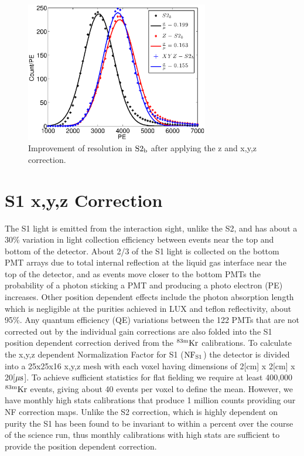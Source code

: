 \begin{figure}[h!]\centering
\includegraphics[width=80mm]{Chapter_XYZ_Corr/Thesis_Corr_Plots/S2_corr_res.eps}
\caption{Improvement of resolution in $\rm S2_b$ after applying the z and x,y,z correction. }
\label{fig:S2_res}
\end{figure}



\section{S1 x,y,z Correction}

The S1 light is emitted from the interaction sight, unlike the S2, and has about a 30\% variation in light collection efficiency between events near the top and bottom of the detector. About 2/3 of the S1 light is collected on the bottom PMT arrays due to total internal reflection at the liquid gas interface near the top of the detector, and as events move closer to the bottom PMTs the probability of a photon sticking a PMT and producing a photo electron (PE) increases. Other position dependent effects include the photon absorption length which is negligible at the purities achieved in LUX and teflon reflectivity, about 95\%. Any quantum efficiency (QE) variations between the 122 PMTs that are not corrected out by the individual gain corrections are also folded into the S1 position dependent correction derived from the $\rm^{83m}Kr$ calibrations.
To calculate the x,y,z dependent Normalization Factor for S1 ($\rm NF_{S1}$) the detector is divided into a 25x25x16 x,y,z mesh with each voxel having dimensions of 2[cm] x 2[cm] x 20[$\rm \mu s$]. To achieve sufficient statistics for flat fielding we require at least 400,000 $\rm^{83m}Kr$ events, giving about 40 events per voxel to define the mean. However, we have monthly high stats calibrations that produce 1 million counts providing our NF correction maps. Unlike the S2 correction, which is highly dependent on purity the S1 has been found to be invariant to within a percent over the course of the science run, thus monthly calibrations with high stats are sufficient to provide the position dependent correction.


